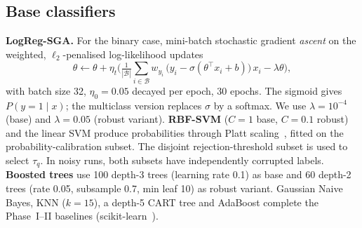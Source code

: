 \documentclass[conference]{IEEEtran}
\begin{document}
\subsection{Base classifiers}
\textbf{LogReg-SGA.} For the binary case, mini-batch stochastic gradient \emph{ascent} on the weighted, $\ell_2$-penalised log-likelihood updates
\begin{equation}
\theta \leftarrow \theta + \eta_t\Big(\tfrac1{|\mathcal B|}\textstyle\sum_{i\in\mathcal B} w_{y_i}\,\big(y_i-\sigma(\theta^\top x_i+b)\big)\,x_i-\lambda\theta\Big),
\end{equation}
with batch size 32, $\eta_0{=}0.05$ decayed per epoch, 30 epochs. The sigmoid gives $P(y{=}1\mid x)$; the multiclass version replaces $\sigma$ by a softmax. We use $\lambda=10^{-4}$ (base) and $\lambda=0.05$ (robust variant).
\textbf{RBF-SVM} ($C{=}1$ base, $C{=}0.1$ robust) and the linear SVM produce probabilities through Platt scaling~\cite{platt1999probabilistic}, fitted on the probability-calibration subset. The disjoint rejection-threshold subset is used to select $\tau_q$. In noisy runs, both subsets have independently corrupted labels. \textbf{Boosted trees} use 100 depth-3 trees (learning rate 0.1) as base and 60 depth-2 trees (rate 0.05, subsample 0.7, min leaf 10) as robust variant. Gaussian Naive Bayes, KNN ($k{=}15$), a depth-5 CART tree and AdaBoost complete the Phase~I--II baselines (scikit-learn~\cite{pedregosa2011sklearn}).
\end{document}
